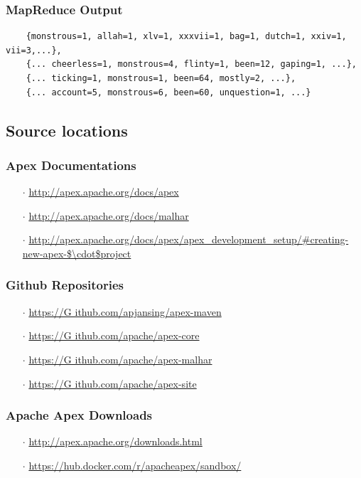 \documentclass[final]{IEEEtran}
\begin{document}
\subsubsection{MapReduce Output}\label{sec:map-reduce-output}
  \begin{lstlisting}
    {monstrous=1, allah=1, xlv=1, xxxvii=1, bag=1, dutch=1, xxiv=1, vii=3,...},
    {... cheerless=1, monstrous=4, flinty=1, been=12, gaping=1, ...},
    {... ticking=1, monstrous=1, been=64, mostly=2, ...},
    {... account=5, monstrous=6, been=60, unquestion=1, ...}
  \end{lstlisting}


\subsection{Source locations}

\subsubsection{Apex Documentations}\label{sec:apex-docs}
\begin{enumerate}
  \item[$\cdot$] \url{http://apex.apache.org/docs/apex}
  \item[$\cdot$] \url{http://apex.apache.org/docs/malhar}
  \item[$\cdot$] \url{http://apex.apache.org/docs/apex/apex_development_setup/#creating-new-apex-$\cdot$project}
\end{enumerate}

\subsubsection{Github Repositories}\label{sec:repos}
\begin{enumerate}
  \item[$\cdot$] \url{https://G
ithub.com/apjansing/apex-maven}
  \item[$\cdot$] \url{https://G
ithub.com/apache/apex-core}
  \item[$\cdot$] \url{https://G
ithub.com/apache/apex-malhar}
  \item[$\cdot$] \url{https://G
ithub.com/apache/apex-site}
\end{enumerate} 

\subsubsection{Apache Apex Downloads}\label{sec:apex-downloads}
\begin{enumerate}
	\item[$\cdot$] \url{http://apex.apache.org/downloads.html}
	\item[$\cdot$] \url{https://hub.docker.com/r/apacheapex/sandbox/}
\end{enumerate}
\end{document}
